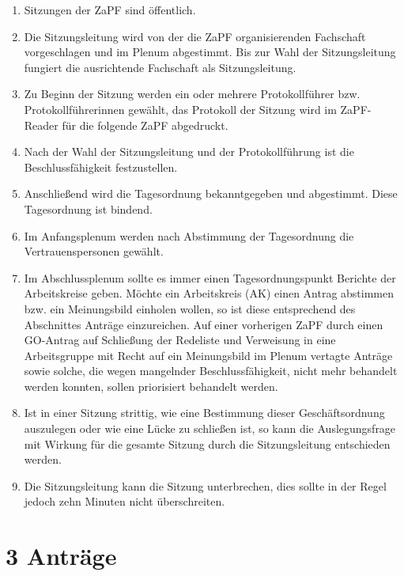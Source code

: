 \documentclass[12pt,oneside]{scrartcl}
\begin{document}
\begin{enumerate}
\item Sitzungen der ZaPF sind öffentlich.

\item Die Sitzungsleitung wird von der die ZaPF organisierenden Fachschaft
vorgeschlagen und im Plenum abgestimmt.
Bis zur Wahl der Sitzungsleitung fungiert die ausrichtende Fachschaft als
Sitzungsleitung.

\item Zu Beginn der Sitzung werden ein oder mehrere Protokollführer bzw.
Protokollführerinnen gewählt, das Protokoll der Sitzung wird im
ZaPF-Reader für die folgende ZaPF abgedruckt.

\item Nach der Wahl der Sitzungsleitung und der Protokollführung ist die
Beschlussfähigkeit festzustellen.

\item Anschließend wird die Tagesordnung bekanntgegeben und abgestimmt.
Diese Tagesordnung ist bindend.

\item Im Anfangsplenum werden nach Abstimmung der Tagesordnung die
Vertrauenspersonen gewählt.

\item Im Abschlussplenum sollte es immer einen Tagesordnungspunkt \textquotedbl{}Berichte
der Arbeitskreise\textquotedbl{} geben.
Möchte ein Arbeitskreis (AK) einen Antrag abstimmen bzw. ein Meinungsbild
einholen wollen, so ist diese entsprechend des Abschnittes \textquotedbl{}Anträge\textquotedbl{}
einzureichen.
Auf einer vorherigen ZaPF durch einen GO-Antrag auf \textquotedbl{}Schließung der Redeliste
und Verweisung in eine Arbeitsgruppe mit Recht auf ein Meinungsbild im
Plenum\textquotedbl{} vertagte Anträge sowie solche, die wegen mangelnder
Beschlussfähigkeit, nicht mehr behandelt werden konnten, sollen priorisiert
behandelt werden.

\item Ist in einer Sitzung strittig, wie eine Bestimmung dieser Geschäftsordnung
auszulegen oder wie eine Lücke zu schließen ist, so kann die Auslegungsfrage
mit Wirkung für die gesamte Sitzung durch die Sitzungsleitung entschieden
werden.

\item Die Sitzungsleitung kann die Sitzung unterbrechen, dies sollte in der
Regel jedoch zehn Minuten nicht überschreiten.
\end{enumerate}


\section{3 Anträge%
  \label{antrage}%
}
\end{document}
